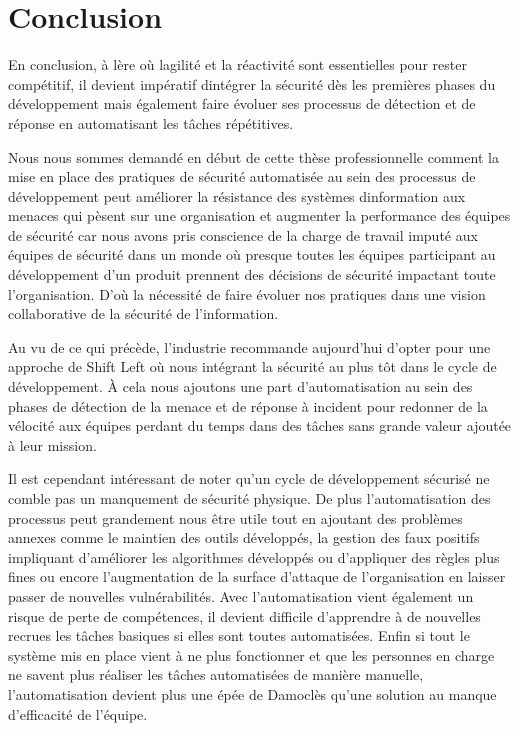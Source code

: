 \documentclass[
  11pt,
  a4paper,
  krantz2,
  11pt,
  oneside]{krantz}
\begin{document}
\chapter{Conclusion}\label{conclusion}

En conclusion, à l\textquotesingle ère où l\textquotesingle agilité et la réactivité sont essentielles pour rester compétitif, il devient impératif d\textquotesingle intégrer la sécurité dès les premières phases du développement mais également faire évoluer ses processus de détection et de réponse en automatisant les tâches répétitives.

Nous nous sommes demandé en début de cette thèse professionnelle comment la mise en place des pratiques de sécurité automatisée au sein des processus de développement peut améliorer la résistance des systèmes d\textquotesingle information aux menaces qui pèsent sur une organisation et augmenter la performance des équipes de sécurité car nous avons pris conscience de la charge de travail imputé aux équipes de sécurité dans un monde où presque toutes les équipes participant au développement d'un produit prennent des décisions de sécurité impactant toute l'organisation. D'où la nécessité de faire évoluer nos pratiques dans une vision collaborative de la sécurité de l'information.

Au vu de ce qui précède, l'industrie recommande aujourd'hui d'opter pour une approche de Shift Left où nous intégrant la sécurité au plus tôt dans le cycle de développement. À cela nous ajoutons une part d'automatisation au sein des phases de détection de la menace et de réponse à incident pour redonner de la vélocité aux équipes perdant du temps dans des tâches sans grande valeur ajoutée à leur mission.

Il est cependant intéressant de noter qu'un cycle de développement sécurisé ne comble pas un manquement de sécurité physique. De plus l'automatisation des processus peut grandement nous être utile tout en ajoutant des problèmes annexes comme le maintien des outils développés, la gestion des faux positifs impliquant d'améliorer les algorithmes développés ou d'appliquer des règles plus fines ou encore l'augmentation de la surface d'attaque de l'organisation en laisser passer de nouvelles vulnérabilités. Avec l'automatisation vient également un risque de perte de compétences, il devient difficile d'apprendre à de nouvelles recrues les tâches basiques si elles sont toutes automatisées. Enfin si tout le système mis en place vient à ne plus fonctionner et que les personnes en charge ne savent plus réaliser les tâches automatisées de manière manuelle, l'automatisation devient plus une épée de Damoclès qu'une solution au manque d'efficacité de l'équipe.
\end{document}
